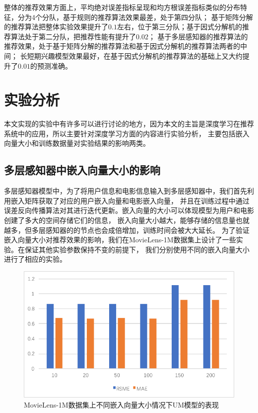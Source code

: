整体的推荐效果方面上，平均绝对误差指标呈现和均方根误差指标类似的分布特征，分为4个分队，基于规则的推荐算法效果最差，处于第四分队；
基于矩阵分解的推荐算法把整体实验效果提升了$0.1$左右，位于第三分队；基于因式分解机的推荐算法处于第二分队，把推荐性能有提升了$0.02$；
基于多层感知器的推荐算法的推荐效果，处于基于矩阵分解的推荐算法和基于因式分解机的推荐算法两者的中间；
长短期兴趣模型效果最好，在基于因式分解机的推荐算法的基础上又大约提升了$0.01$的预测准确。

\section{实验分析}
本文实现的实验中有许多可以进行讨论的地方，因为本文的主旨是深度学习在推荐系统中的应用，所以主要针对深度学习方面的内容进行实验分析，
主要包括嵌入向量大小和训练数据量对实验结果的影响两类。

\subsection{多层感知器中嵌入向量大小的影响}
多层感知器模型中，为了将用户信息和电影信息输入到多层感知器中，我们首先利用嵌入矩阵获取了对应的用户嵌入向量和电影嵌入向量，
并且在训练过程中通过误差反向传播算法对其进行迭代更新。嵌入向量的大小可以体现模型为用户和电影创建了多大的空间存储它们的信息，
嵌入向量大小越大，能够存储的信息量也就越多，但多层感知器的的节点也会成倍增加，训练时间会被大大延长。
为了验证嵌入向量大小对推荐效果的影响，我们在MovieLens-1M数据集上设计了一些实验。在保证其他实验参数保持不变的前提下，
我们分别使用不同的嵌入向量大小进行了相应的实验。

\begin{figure}[htbp]
    \centering
    \includegraphics[scale=0.7]{images/UM.pdf}
    \caption{MovieLens-1M数据集上不同嵌入向量大小情况下UM模型的表现}
    \label{fig:um}
\end{figure}

